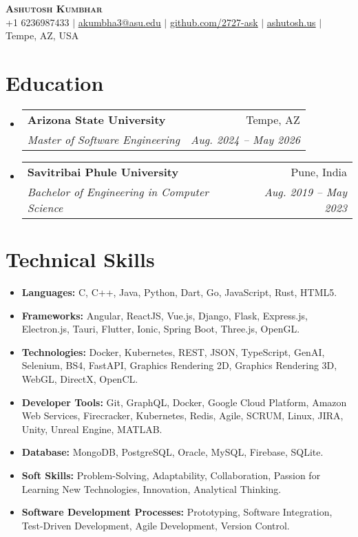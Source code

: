 \documentclass[letterpaper,11pt]{article}
\makeatletter
\newcommand{\resumeItem}[1]{
  \item\small{
    {#1 \vspace{-2pt}}
  }
}
\newcommand{\resumeSubheading}[4]{
  \vspace{-2pt}\item
    \begin{tabular*}{0.97\textwidth}[t]{l@{\extracolsep{\fill}}r}
      \textbf{#1} & #2 \\
      \textit{\small#3} & \textit{\small #4} \\
    \end{tabular*}\vspace{-7pt}
}
\newcommand{\resumeSubItem}[1]{\resumeItem{#1}\vspace{-4pt}}
\newcommand{\resumeSubHeadingListStart}{\begin{itemize}[leftmargin=0.15in, label={}]}
\newcommand{\resumeSubHeadingListEnd}{\end{itemize}}
\makeatother
\begin{document}
\begin{center}
    \textbf{\Huge \scshape Ashutosh Kumbhar} \\ \vspace{1pt}
    \small +1 6236987433 $|$ \href{mailto:akumbha3@asu.edu}{\underline{akumbha3@asu.edu}} $|$ 
    \href{https://github.com/2727-ask}{\underline{github.com/2727-ask}} $|$
    \href{https://ashutosh.us}{\underline{ashutosh.us}} $|$
    \small Tempe, AZ, USA
\end{center}


\section{Education}
  \resumeSubHeadingListStart
    \resumeSubheading
      {Arizona State University}{Tempe, AZ}
      {Master of Software Engineering}{Aug. 2024 -- May 2026}
    \resumeSubheading
      {Savitribai Phule University}{Pune, India}
      {Bachelor of Engineering in Computer Science}{Aug. 2019 -- May 2023}
  \resumeSubHeadingListEnd
  

\section{Technical Skills}
\resumeSubHeadingListStart
  \resumeSubItem{\textbf{Languages:} C, C++, Java, Python, Dart, Go, JavaScript, Rust, HTML5.}
  \resumeSubItem{\textbf{Frameworks:} Angular, ReactJS, Vue.js, Django, Flask, Express.js, Electron.js, Tauri, Flutter, Ionic, Spring Boot, Three.js, OpenGL.}
  \resumeSubItem{\textbf{Technologies:} Docker, Kubernetes, REST, JSON, TypeScript, GenAI, Selenium, BS4, FastAPI, Graphics Rendering 2D, Graphics Rendering 3D, WebGL, DirectX, OpenCL.}
  \resumeSubItem{\textbf{Developer Tools:} Git, GraphQL, Docker, Google Cloud Platform, Amazon Web Services, Firecracker, Kubernetes, Redis, Agile, SCRUM, Linux, JIRA, Unity, Unreal Engine, MATLAB.}
  \resumeSubItem{\textbf{Database:} MongoDB, PostgreSQL, Oracle, MySQL, Firebase, SQLite.}
  \resumeSubItem{\textbf{Soft Skills:} Problem-Solving, Adaptability, Collaboration, Passion for Learning New Technologies, Innovation, Analytical Thinking.}
  \resumeSubItem{\textbf{Software Development Processes:} Prototyping, Software Integration, Test-Driven Development, Agile Development, Version Control.}
\resumeSubHeadingListEnd

\end{document}
